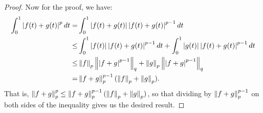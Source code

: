 \begin{proof}
Now for the proof, we have:
\begin{align*}
    \int_0^1\left\lvert f(t)+g(t)\right\rvert^pdt
    =& \int_0^1\left\lvert f(t)+g(t)\right\rvert\left\lvert f(t)+g(t)\right\rvert^{p-1}dt\\
    \leq& \int_0^1\left\lvert f(t)\right\rvert\left\lvert f(t)+g(t)\right\rvert^{p-1}dt + \int_0^1\left\lvert g(t)\right\rvert\left\lvert f(t)+g(t)\right\rvert^{p-1}dt\\
    \leq& \left\lVert f\right\rVert_p\left\lVert \left\lvert f+g\right\rvert^{p-1}\right\rVert_q + \left\lVert g\right\rVert_p\left\lVert \left\lvert f+g\right\rvert^{p-1}\right\rVert_q\\
    =& \left\lVert f+g\right\rVert^{p-1}_p(\left\lVert f\right\rVert_p+\left\lVert g\right\rVert_p).
\end{align*}
That is, $\left\lVert f+g\right\rVert^p_p\leq\left\lVert f+g\right\rVert^{p-1}_p(\left\lVert f\right\rVert_p+\left\lVert g\right\rVert_p)$, so that dividing by $\left\lVert f+g\right\rVert^{p-1}_p$ on both sides of the inequality gives us the desired result.
\end{proof} 
